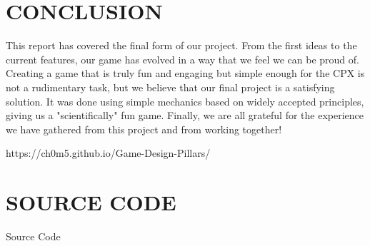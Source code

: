 \documentclass[12pt]{article}
\begin{document}
\section{CONCLUSION}
This report has covered the final form of our project. From the first ideas to the current features, our game has evolved in a way that we feel we can be proud of. Creating a game that is truly fun and engaging but simple enough for the CPX is not a rudimentary task, but we believe that our final project is a satisfying solution. It was done using simple mechanics based on widely accepted principles, giving us a "scientifically" fun game. Finally, we are all grateful for the experience we have gathered from this project and from working together!

\newpage



https://ch0m5.github.io/Game-Design-Pillars/
\newpage
\appendix

\section{SOURCE CODE}
Source Code

\end{document}
